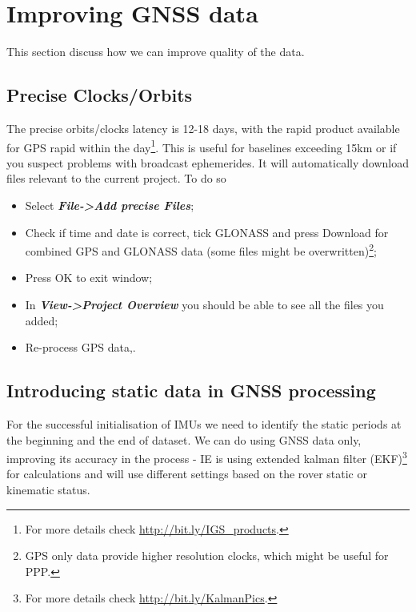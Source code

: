 \documentclass[11pt,fleqn]{book} %
\newcommand{\moreInfo}[1]{\footnote{For more details check \url{#1}.}}
\begin{document}



\section{Improving GNSS data}

This section discuss how we can improve quality of the data.


\subsection{Precise Clocks/Orbits}

The precise orbits/clocks latency is 12-18 days, with the rapid product available for GPS rapid within the day\moreInfo{http://bit.ly/IGS_products}. This is useful for baselines exceeding 15km or if you suspect problems with broadcast ephemerides. It will automatically download files relevant to the current project. To do so 

\begin{itemize}
	\item Select \textbf{\emph{File->Add precise Files}};
	\item Check if time and date is correct, tick GLONASS and press Download for combined GPS and GLONASS data (some files might be overwritten)\footnote{GPS only data provide higher resolution clocks, which might be useful for PPP.};
	\item Press OK to exit window;
	\item In \textbf{\emph{View->Project Overview}} you should be able to see all the files you added;
	\item Re-process GPS data,.
\end{itemize}


\subsection{Introducing static data in GNSS processing}

For the successful initialisation of IMUs we need to identify the static periods at the beginning and the end of dataset. We can do using GNSS data only, improving its accuracy in the process - IE is using extended kalman filter (EKF)\moreInfo{http://bit.ly/KalmanPics} for calculations and will use different settings based on the rover static or kinematic status.
\end{document}
